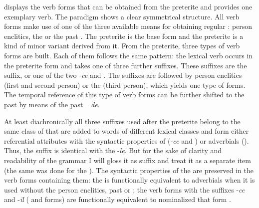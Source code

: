  displays the verb forms that can be obtained from the preterite and  provides one exemplary verb. The paradigm shows a clear symmetrical structure. All verb forms make use of one of the three available means for obtaining regular : person enclitics, the   or the past . The preterite is the base form and the preterite  is a kind of minor variant derived from it. From the preterite, three types of verb forms are built. Each of them follows the same pattern: the lexical verb occurs in the preterite form and takes one of three further suffixes. These suffixes are the  suffix, or one of the two  \textit{-ce} and . The suffixes are followed by person enclitics (first and second person) or the  (third person), which yields one type of forms. The temporal reference of this type of verb forms can be further shifted to the past by means of the past  =\textit{de}. 

At least diachronically all three suffixes used after the preterite belong to the same class of  that are added to words of different lexical classes and form either referential attributes with the syntactic properties of  (\textit{-ce} and ) or adverbials (). Thus, the  suffix is identical with the  -\textit{le}. But for the sake of clarity and readability of the grammar I will gloss it as  suffix and treat it as a separate item (the same was done for the ). The syntactic properties of the  are preserved in the verb forms containing them: the  is functionally equivalent to adverbials when it is used without the person enclitics, past  or ; the verb forms with the suffixes -\textit{ce} and -\textit{il} ( and  forms) are functionally equivalent to nominalized  that form .


